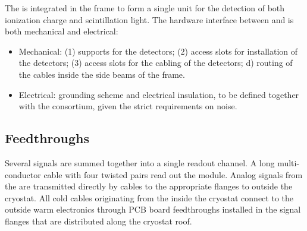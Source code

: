 


The  is integrated in the  frame to form a single unit for the detection of both ionization charge and scintillation light. 
The hardware interface between  and  is both mechanical and electrical: 
\begin{itemize}
\item Mechanical: (1) supports for the  detectors; (2) access slots for installation of the detectors;
 (3) access slots for the cabling of the  detectors; d) routing of the  cables inside the side beams of the  frame.
\item Electrical: grounding scheme and electrical insulation, to be defined together with the  consortium, given the  strict requirements on noise.
\end{itemize}


\subsection{Feedthroughs}
\label{sec:fdsp-pd-intfc-feed}

Several   signals are summed together into a single readout channel. A long multi-conductor cable with four twisted pairs read out the  module. 
Analog signals from the  are transmitted directly by cables to the appropriate flanges to outside the cryostat. 
All cold cables originating from the inside the cryostat connect to the outside warm electronics through PCB board feedthroughs installed in the signal flanges that are distributed along the cryostat roof.

